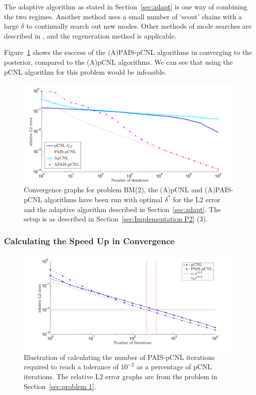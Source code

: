 \documentclass[final]{siamltex}
\begin{document}
The adaptive algorithm as stated in Section~\ref{sec:adapt} is one way of combining the two regimes. Another method uses a small number of `scout' chains with a large $\delta$ to continually search out new modes. Other methods of mode searches are described in \cite{lan2013wormhole}, and the regeneration method is applicable\cite{nummelin1984general}.

Figure~\ref{fig:BM2_AL2} shows the success of the (A)PAIS-pCNL algorithms in converging to the posterior, compared to the (A)pCNL algorithms. We can see that using the pCNL algorithm for this problem would be infeasible.

\begin{figure}
\begin{center}
\includegraphics[width=\textwidth]{"figures/BM2_AL2"}
\caption{Convergence graphs for problem BM(2), the (A)pCNL and (A)PAIS-pCNL algorithms have been run with optimal $\delta^*$ for the L2 error and the adaptive algorithm described in Section~\ref{sec:adapt}. The setup is as described in Section~\ref{sec:Implementation P2} (3).}
\label{fig:BM2_AL2}
\end{center}
\end{figure}

\subsubsection{Calculating the Speed Up in Convergence}\label{sec:calc_saving}

\begin{figure}
\begin{center}
\includegraphics[width=\textwidth]{"figures/calc_saving"}
\caption{Illustration of calculating the number of PAIS-pCNL iterations required to reach a tolerance of $10^{-2}$ as a percentage of pCNL iterations. The relative L2 error graphs are from the problem in Section~\ref{sec:problem 1}.}
\label{fig:calc_saving}
\end{center}
\end{figure}
\end{document}
